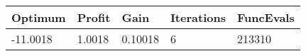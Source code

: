 \begin{tabular}{lllll}
Optimum & Profit & Gain & Iterations & FuncEvals \\ 
\hline 
-11.0018 & 1.0018 & 0.10018 & 6 & 213310 \\ 
\hline 
\end{tabular}